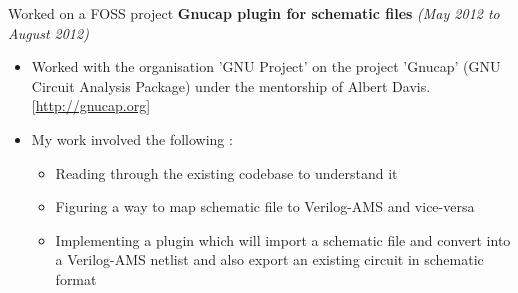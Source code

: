 \documentclass[a4paper,11pt]{article}
\newcommand{\isep}{-2 pt}
\begin{document}
\hspace{1mm} Worked on a FOSS project \textbf{Gnucap plugin for schematic files} \hfill \emph{(May 2012 to August 2012)} \\[-0.6cm]
    \begin{itemize}
        \item Worked with the organisation 'GNU Project' on the project 'Gnucap' (GNU Circuit Analysis Package) under the mentorship of Albert Davis. \hfill  [\url{http://gnucap.org}] \\[-0.6cm]
        \item My work involved the following :
        \begin{itemize} \itemsep \isep
        \item Reading through the existing codebase to understand it 
        \item Figuring a way to map schematic file to Verilog-AMS and vice-versa
        \item Implementing a plugin which will import a schematic file and convert into a Verilog-AMS netlist and also export an existing circuit in schematic format
        
    \end{itemize}
    \end{itemize} 
\end{document}
